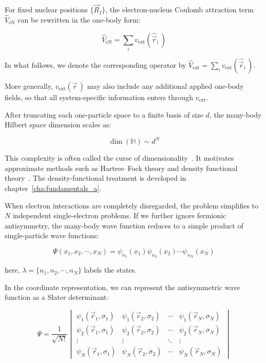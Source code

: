 For fixed nuclear positions $\{\vec{R}_I\}$, the electron-nucleus Coulomb attraction term $\hat{V}_\mathrm{eN}$ can be rewritten in the one-body form:

\begin{equation}
    \hat{V}_\mathrm{eN}=\sum_i v_\mathrm{ext}(\hat{\vec{r}}_i\,)
\label{Electron-nucleus_one-body_form}
\end{equation}

In what follows, we denote the corresponding operator by $\hat{V}_\mathrm{ext}=\sum_i v_\mathrm{ext}(\hat{\vec{r}}_i\,)$.

More generally, $v_\mathrm{ext}(\vec{r}\,)$ may also include any additional applied one-body fields, so that all system-specific information enters through $v_\mathrm{ext}$.

After truncating each one-particle space to a finite basis of size $d$, the many-body Hilbert space dimension scales as:

\begin{equation}
    \dim(\mathbb{H})\sim d^{N}
\label{exponential_growth}
\end{equation}

This complexity is often called the curse of dimensionality~\cite{alhambra2023quantum}.
It motivates approximate methods such as Hartree--Fock theory and density functional theory~\cite{pribram2015dft,jones2015density}.
The density-functional treatment is developed in chapter~\ref{cha:fundamentals_a}.

When electron interactions are completely disregarded, the problem simplifies to $N$ independent single-electron problems.
If we further ignore fermionic antisymmetry, the many-body wave function reduces to a simple product of single-particle wave functions:

\begin{equation}
    \Psi(x_1,x_2,\cdots,x_N)=\psi_{n_1}(x_1)\psi_{n_2}(x_2)\cdots\psi_{n_N}(x_N)
\label{independent_body_function}
\end{equation}

here, $\lambda=\{n_1,n_2,\cdots,n_N\}$ labels the states.

In the coordinate representation, we can represent the antisymmetric wave function as a Slater determinant:

\begin{equation}
    \Psi = \frac{1}{\sqrt{N!}}
    \begin{vmatrix}
    \psi_1(\vec{r}_1,\sigma_1) & \psi_1(\vec{r}_2,\sigma_2) & \cdots & \psi_1(\vec{r}_N,\sigma_N)\\
    \psi_2(\vec{r}_1,\sigma_1) & \psi_2(\vec{r}_2,\sigma_2) & \cdots & \psi_2(\vec{r}_N,\sigma_N)\\
    \vdots & \vdots & \ddots & \vdots\\
    \psi_N(\vec{r}_1,\sigma_1) & \psi_N(\vec{r}_2,\sigma_2) & \cdots & \psi_N(\vec{r}_N,\sigma_N)
    \end{vmatrix}
\label{slater_determinant}
\end{equation}

